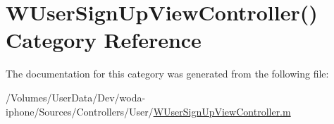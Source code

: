 \hypertarget{category_w_user_sign_up_view_controller_07_08}{\section{W\-User\-Sign\-Up\-View\-Controller() Category Reference}
\label{category_w_user_sign_up_view_controller_07_08}
}


The documentation for this category was generated from the following file\-:\begin{DoxyCompactItemize}
\item 
/\-Volumes/\-User\-Data/\-Dev/woda-\/iphone/\-Sources/\-Controllers/\-User/\hyperlink{_w_user_sign_up_view_controller_8m}{W\-User\-Sign\-Up\-View\-Controller.\-m}\end{DoxyCompactItemize}
